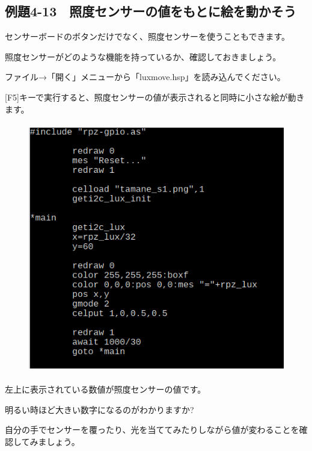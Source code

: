 \newpage
\subsection{例題4-13　照度センサーの値をもとに絵を動かそう}

\begin{description}
    \item {}
\end{description}

センサーボードのボタンだけでなく、照度センサーを使うこともできます。

照度センサーがどのような機能を持っているか、確認しておきましょう。


ファイル→「開く」メニューから「luxmove.hsp」を読み込んでください。

[F5]キーで実行すると、照度センサーの値が表示されると同時に小さな絵が動きます。

\begin{figure}[H]
    \begin{center}
      \includegraphics[keepaspectratio,width=11.615cm,height=10.94cm]{text04-img/text04-img040.png}
    \end{center}
    \label{fig:prog_menu}
\end{figure}

左上に表示されている数値が照度センサーの値です。

明るい時ほど大きい数字になるのがわかりますか?

自分の手でセンサーを覆ったり、光を当ててみたりしながら値が変わることを確認してみましょう。

